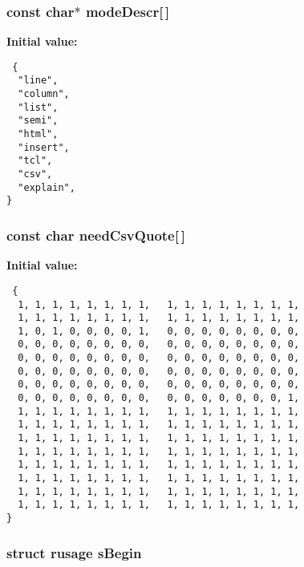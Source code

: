 \subsubsection{\setlength{\rightskip}{0pt plus 5cm}const char$\ast$ \bf{mode\-Descr}[$\,$]\hspace{0.3cm}{\tt  [static]}}\label{shell_8c_a4f12ad742d84e6b7178041f767c087e}


\textbf{Initial value:}

\begin{Code}\begin{verbatim} {
  "line",
  "column",
  "list",
  "semi",
  "html",
  "insert",
  "tcl",
  "csv",
  "explain",
}
\end{verbatim}\end{Code}
\subsubsection{\setlength{\rightskip}{0pt plus 5cm}const char \bf{need\-Csv\-Quote}[$\,$]\hspace{0.3cm}{\tt  [static]}}\label{shell_8c_2bf82b89bb4c95c96d328b320447072c}


\textbf{Initial value:}

\begin{Code}\begin{verbatim} {
  1, 1, 1, 1, 1, 1, 1, 1,   1, 1, 1, 1, 1, 1, 1, 1,   
  1, 1, 1, 1, 1, 1, 1, 1,   1, 1, 1, 1, 1, 1, 1, 1,   
  1, 0, 1, 0, 0, 0, 0, 1,   0, 0, 0, 0, 0, 0, 0, 0, 
  0, 0, 0, 0, 0, 0, 0, 0,   0, 0, 0, 0, 0, 0, 0, 0, 
  0, 0, 0, 0, 0, 0, 0, 0,   0, 0, 0, 0, 0, 0, 0, 0, 
  0, 0, 0, 0, 0, 0, 0, 0,   0, 0, 0, 0, 0, 0, 0, 0, 
  0, 0, 0, 0, 0, 0, 0, 0,   0, 0, 0, 0, 0, 0, 0, 0, 
  0, 0, 0, 0, 0, 0, 0, 0,   0, 0, 0, 0, 0, 0, 0, 1, 
  1, 1, 1, 1, 1, 1, 1, 1,   1, 1, 1, 1, 1, 1, 1, 1,   
  1, 1, 1, 1, 1, 1, 1, 1,   1, 1, 1, 1, 1, 1, 1, 1,   
  1, 1, 1, 1, 1, 1, 1, 1,   1, 1, 1, 1, 1, 1, 1, 1,   
  1, 1, 1, 1, 1, 1, 1, 1,   1, 1, 1, 1, 1, 1, 1, 1,   
  1, 1, 1, 1, 1, 1, 1, 1,   1, 1, 1, 1, 1, 1, 1, 1,   
  1, 1, 1, 1, 1, 1, 1, 1,   1, 1, 1, 1, 1, 1, 1, 1,   
  1, 1, 1, 1, 1, 1, 1, 1,   1, 1, 1, 1, 1, 1, 1, 1,   
  1, 1, 1, 1, 1, 1, 1, 1,   1, 1, 1, 1, 1, 1, 1, 1,   
}
\end{verbatim}\end{Code}
\subsubsection{\setlength{\rightskip}{0pt plus 5cm}struct rusage \bf{s\-Begin}\hspace{0.3cm}{\tt  [static]}}\label{shell_8c_6ec49c758c9d39def0d62e135b63a89a}


